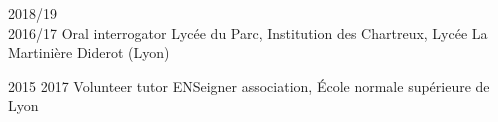 \documentclass[letterpaper]{cvtemplate_en} %
\begin{document}
\begin{cvbody}

\cvitem
	{2018/19\\ \mbox{}\hfill 2016/17}
	{}
	{Oral interrogator}
	{Lyc\'ee du Parc, Institution des Chartreux, Lyc\'ee La Martinière Diderot (Lyon) }
	{}{}{}
	{}
	{
	}


\cvitem
	{2015}
	{2017}
	{Volunteer tutor}
	{ENSeigner association, \'Ecole normale sup\'erieure de Lyon }
	{}{}{}
	{}
	{
	}

\end{cvbody}
\end{document}
